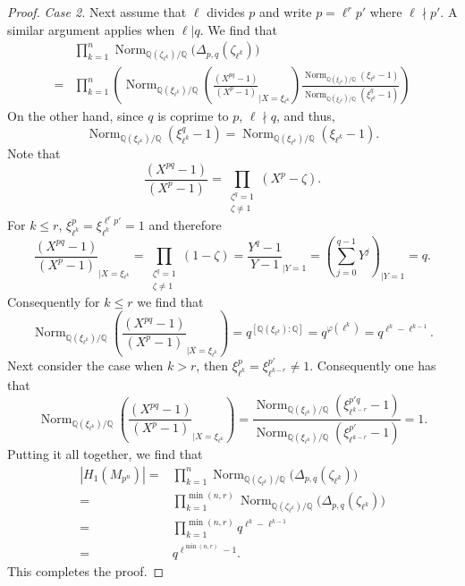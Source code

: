 \documentclass[table]{amsart}
\newcommand{\Q}{\mathbb{Q}}
\newcommand{\op}[1]{\operatorname{#1}}
\numberwithin{equation}{section}
\begin{document}
\begin{proof}
\vspace{0.5em}
\noindent
\emph{Case 2.} Next assume that $\ell$ divides $p$ and write $p=\ell^r p'$ where $\ell\nmid p'$. A similar argument applies when $\ell|q$. We find that \[\begin{split}&\prod_{k=1}^{n}
\operatorname{Norm}_{\mathbb{Q}(\zeta_{\ell^k})/\mathbb{Q}}
\big(\Delta_{p,q}(\zeta_{\ell^k})\big)\\
=& \prod_{k=1}^n \left(\op{Norm}_{\Q(\xi_{\ell^k})/\Q}\left(\frac{(X^{pq}-1)}{(X^p-1)}_{|X=\xi_{\ell^k}}\right)\frac{\op{Norm}_{\Q(\xi_{\ell^k})/\Q}(\xi_{\ell^k}-1)}{\op{Norm}_{\Q(\xi_{\ell^k})/\Q}(\xi_{\ell^k}^q-1)}\right)\end{split}\] On the other hand, since $q$ is coprime to $p$, $\ell\nmid q$, and thus, \[\op{Norm}_{\Q(\xi_{\ell^k})/\Q}(\xi_{\ell^k}^q-1)=\op{Norm}_{\Q(\xi_{\ell^k})/\Q}(\xi_{\ell^k}-1).\]Note that \[\frac{(X^{pq}-1)}{(X^{p}-1)}=\prod_{\substack{\zeta^q=1\\ \zeta\neq 1} } (X^p-\zeta).\] For $k\leq r$, $\xi_{\ell^k}^p=\xi_{\ell^k}^{\ell^r p'}=1$ and therefore
\[\frac{(X^{pq}-1)}{(X^{p}-1)}_{|X=\xi_{\ell^k}}=\prod_{\substack{\zeta^q=1\\ \zeta\neq 1} } (1-\zeta)=\frac{Y^q-1}{Y-1}_{|Y=1}=\left(\sum_{j=0}^{q-1} Y^j\right)_{|Y=1}=q.\]
Consequently for $k\leq r$ we find that \[\op{Norm}_{\Q(\xi_{\ell^k})/\Q}\left(\frac{(X^{pq}-1)}{(X^p-1)}_{|X=\xi_{\ell^k}}\right)=q^{[\Q(\xi_{\ell^k}):\Q]}=q^{\varphi(\ell^k)}=q^{\ell^k-\ell^{k-1}}.\]
\noindent Next consider the case when $k>r$, then $\xi_{\ell^k}^p=\xi_{\ell^{k-r}}^{p'}\neq 1$. Consequently one has that
\[\op{Norm}_{\Q(\xi_{\ell^k})/\Q}\left(\frac{(X^{pq}-1)}{(X^p-1)}_{|X=\xi_{\ell^k}}\right)=\frac{\op{Norm}_{\Q(\xi_{\ell^k})/\Q} (\xi_{\ell^{k-r}}^{p'q}-1)}{\op{Norm}_{\Q(\xi_{\ell^k})/\Q}(\xi_{\ell^{k-r}}^{p'}-1)}=1.\]
Putting it all together, we find that \[\begin{split}|H_1(M_{p^n})|=&\prod_{k=1}^{n}
\operatorname{Norm}_{\mathbb{Q}(\zeta_{\ell^k})/\mathbb{Q}}
\big(\Delta_{p,q}(\zeta_{\ell^k})\big)\\=&\prod_{k=1}^{\op{min}(n,r)}
\operatorname{Norm}_{\mathbb{Q}(\zeta_{\ell^k})/\mathbb{Q}}
\big(\Delta_{p,q}(\zeta_{\ell^k})\big)\\
=&\prod_{k=1}^{\op{min}(n,r)}q^{\ell^k-\ell^{k-1}}\\= &q^{\ell^{\op{min}(n,r)}-1}.\end{split}\] This completes the proof.
\end{proof}
\end{document}
